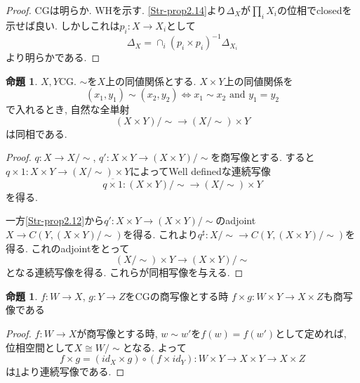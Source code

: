 \documentclass[dvipdfmx,a4paper,11pt]{article}
\theoremstyle{definition}
\newtheorem{prop}[thm]{命題}
\begin{document}
\begin{proof}
CGは明らか. WHを示す.
\ref{Str-prop2.14}より$\Delta_{X}$が$\prod_i X_i$の位相でclosedを示せば良い.
しかしこれは$p_i : X \to X_i$として
$$
\Delta_X = \cap_{i} (p_i \times p_i)^{-1}\Delta_{X_i}
$$
より明らかである.
\end{proof}

 \begin{tcolorbox}
 [colback = white, colframe = green!35!black, fonttitle = \bfseries,breakable = true]
\begin{prop}\cite[Prop2.17]{Str}
\label{Str-prop2.17}
$X,Y$CG.
$\sim$を$X$上の同値関係とする. 
$X \times Y$上の同値関係を
$$
(x_1,y_1) \sim (x_2, y_2) \Leftrightarrow
x_1 \sim x_2 \text{ and } y_1 = y_2 
$$
で入れるとき, 自然な全単射
$$
(X \times Y)/\sim \to (X/\sim) \times Y
$$
は同相である. 
\end{prop}
\end{tcolorbox}

\begin{proof}
$q : X \to X/\sim$, $q' : X \times Y \to (X \times Y)/\sim$を商写像とする.
すると$q \times 1 : X \times Y \to (X/\sim) \times Y$によってWell definedな連続写像
$$
\overline{q \times 1} : (X \times Y)/\sim \to (X/\sim) \times Y
$$
を得る.

一方\ref{Str-prop2.12}から$q' :  X \times Y \to (X \times Y)/\sim$のadjoint
$ X \to C(Y , (X \times Y)/\sim)$を得る. これより$q^{\sharp} : X/\sim \to C(Y , (X \times Y)/\sim)$を得る. 
これのadjointをとって
$$
(X/\sim) \times Y \to (X \times Y)/\sim
$$
となる連続写像を得る. これらが同相写像を与える.
\end{proof}

 \begin{tcolorbox}
 [colback = white, colframe = green!35!black, fonttitle = \bfseries,breakable = true]
\begin{prop}\cite[Prop 2.20]{Str}
\label{Str-prop2.20}
$f : W \to X$, $g : Y \to Z$をCGの商写像とする時
$f \times g : W \times Y \to X \times Z$も商写像である
\end{prop}
\end{tcolorbox}

\begin{proof}
$f : W \to X$が商写像とする時, $w \sim w'$を$f(w) = f(w')$として定めれば, 
位相空間として$X \cong W/\sim$となる. 
よって
$$
f \times g = (id_X \times g) \circ (f \times id_Y):
W \times Y \to X \times Y \to X \times Z
$$
は\ref{Str-prop2.17}より連続写像である.
\end{proof}
\end{document}
